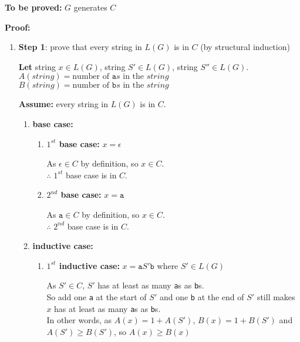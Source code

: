 \documentclass[11pt]{article}
\begin{document}
\begin{enumerate}
\textbf{To be proved:} $G$ generates $C$

\textbf{Proof:} 

\begin{enumerate}
    \item \textbf{Step 1}: prove that every string in $L(G)$ is in $C$ (by structural induction)
    
    \textbf{Let}  string $x \in L(G)$, string $S' \in L(G)$, string $S'' \in L(G)$. \\
    $A(string) = \text{number of } \texttt{a}s \text{ in the } string$ \\
    $B(string) = \text{number of } \texttt{b}s \text{ in the } string$ 
    
    \textbf{Assume:} every string in $L(G)$ is in $C$.
    
    \begin{enumerate}
        \item \textbf{base case:}
    
        \begin{enumerate}
    
            \item \textbf{$1^{st}$ base case:} $x = \epsilon$
            
            As $\epsilon \in C$ by definition, so $x \in C$. \\
            $\therefore$ $1^{st}$ base case is in $C$.
            
            \item \textbf{$2^{nd}$ base case:} $x = \texttt{a}$
            
            As $\texttt{a} \in C$ by definition, so $x \in C$. \\
            $\therefore$ $2^{nd}$ base case is in $C$.
        
        \end{enumerate}
        
        \item \textbf{inductive case:}
    
        \begin{enumerate}
        
            \item \textbf{$1^{st}$ inductive case:} $x = \texttt{a} S' \texttt{b}$ where $S' \in L(G)$
            
            As $S' \in C$, $S'$ has at least as many \texttt{a}s as \texttt{b}s. \\
            So add one \texttt{a} at the start of $S'$ and one \texttt{b} at the end of $S'$ still makes $x$ has at least as many \texttt{a}s as \texttt{b}s. \\
            In other words, as $A(x) = 1 + A(S')$, $B(x) = 1 + B(S')$ and $A(S') \geq B(S')$, so $A(x) \geq B(x)$
            

\end{enumerate}
\end{enumerate}
\end{enumerate}
\end{enumerate}
\end{document}
